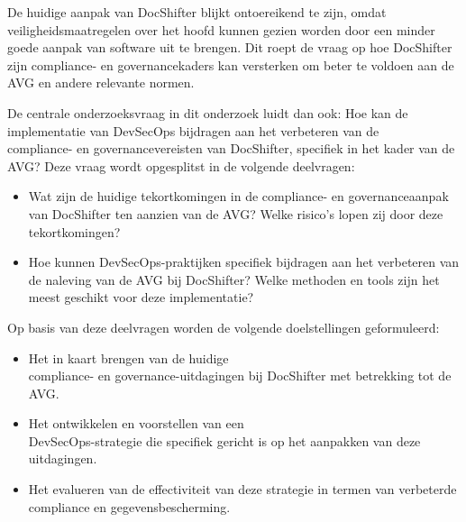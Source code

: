 \documentclass{hogent-article}
\begin{document}
    \noindent De huidige aanpak van DocShifter blijkt ontoereikend te zijn, omdat veiligheidsmaatregelen over het hoofd kunnen gezien worden door een minder goede aanpak van software uit te brengen. Dit roept de vraag op hoe DocShifter zijn compliance- en governancekaders kan versterken om beter te voldoen aan de AVG en andere relevante normen.
    
    \noindent De centrale onderzoeksvraag in dit onderzoek luidt dan ook: Hoe kan de implementatie van DevSecOps bijdragen aan het verbeteren van de\\ compliance- en governancevereisten van DocShifter, specifiek in het kader van de AVG? Deze vraag wordt opgesplitst in de volgende deelvragen:
    
    \begin{itemize}
        \item  Wat zijn de huidige tekortkomingen in de compliance- en governanceaanpak van DocShifter ten aanzien van de AVG? Welke risico's lopen zij door deze tekortkomingen?
    \end{itemize}
    
    \begin{itemize}
        \item  Hoe kunnen DevSecOps-praktijken specifiek bijdragen aan het verbeteren van de naleving van de AVG bij DocShifter? Welke methoden en tools zijn het meest geschikt voor deze implementatie?
    \end{itemize}
    
    \noindent Op basis van deze deelvragen worden de volgende doelstellingen geformuleerd:
    
    \begin{itemize}
        \item Het in kaart brengen van de huidige \\ compliance- en governance-uitdagingen bij DocShifter met betrekking tot de AVG.
    \end{itemize}
    
    \begin{itemize}
        \item Het ontwikkelen en voorstellen van een \\ DevSecOps-strategie die specifiek gericht is op het aanpakken van deze uitdagingen.
    \end{itemize}
    \begin{itemize}
        \item Het evalueren van de effectiviteit van deze strategie in termen van verbeterde compliance en gegevensbescherming.
    \end{itemize}
    
\end{document}
